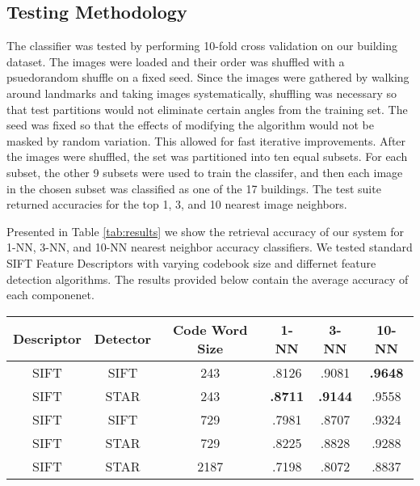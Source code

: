 \subsection{Testing Methodology}

The classifier was tested by performing 10-fold cross validation on our building dataset. 
The images were loaded and their order was shuffled with a psuedorandom shuffle on a fixed seed. 
Since the images were gathered by walking around landmarks and taking images systematically, shuffling was necessary so that test partitions would not eliminate certain angles from the training set. 
The seed was fixed so that the effects of modifying the algorithm would not be masked by random variation. This allowed for fast iterative improvements. After the images were shuffled, the set was partitioned into ten equal subsets. 
For each subset, the other 9 subsets were used to train the classifer, and then each image in the chosen subset was classified as one of the 17 buildings. 
The test suite returned accuracies for the top 1, 3, and 10 nearest image neighbors.


Presented in Table \ref{tab:results} we show the retrieval accuracy of our system for 1-NN, 3-NN, and 10-NN nearest neighbor accuracy classifiers.
We tested standard SIFT Feature Descriptors with varying codebook size and differnet feature detection algorithms.
The results provided below contain the average accuracy of each componenet.

\begin{table*}[ht!]
\label{tab:results}
\centering
\begin{tabular}{| c | c | c | c | c | c |}
\hline
Descriptor & Detector & Code Word Size & 1-NN & 3-NN & 10-NN\\ \hline
SIFT & SIFT & 243 & .8126 & .9081  & \textbf{.9648}  \\ \hline
SIFT & STAR & 243 & \textbf{.8711} & \textbf{.9144} & .9558 \\ \hline
SIFT & SIFT & 729 & .7981 & .8707 & .9324 \\ \hline
SIFT & STAR & 729 & .8225 & .8828 & .9288 \\ \hline
SIFT & STAR & 2187 & .7198 & .8072 & .8837\\ \hline
\end{tabular}
\vspace*{10pt}
\caption{Retrieval Accuracy}
\end{table*}

